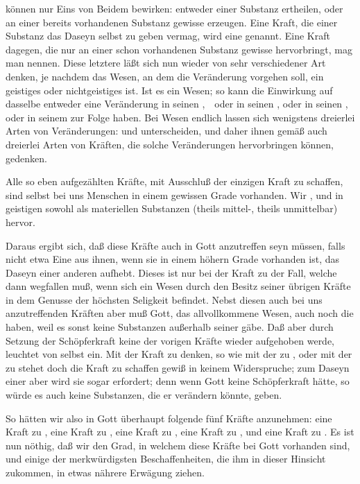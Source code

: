 \begin{aufza}
\item {} können nur Eins von Beidem bewirken: entweder einer Substanz  ertheilen, oder an einer bereits vorhandenen Substanz gewisse  erzeugen. Eine Kraft, die einer Substanz das Daseyn selbst zu geben vermag, wird eine  genannt. Eine Kraft dagegen, die nur an einer schon vorhandenen Substanz gewisse  hervorbringt, mag man  nennen. Diese letztere läßt sich nun wieder von sehr verschiedener Art denken, je nachdem das Wesen, an dem die Veränderung vorgehen soll, ein geistiges oder nichtgeistiges ist. Ist es ein  Wesen; so kann die Einwirkung auf dasselbe entweder eine Veränderung in seinen ,~\ oder in seinen , oder in seinen , oder in seinem  zur Folge haben. Bei  Wesen endlich lassen sich wenigstens dreierlei Arten von Veränderungen:  und  unterscheiden, und daher ihnen gemäß auch dreierlei Arten von Kräften, die solche Veränderungen hervorbringen können, gedenken.
\item Alle so eben aufgezählten Kräfte, mit Ausschluß der einzigen Kraft zu schaffen, sind selbst bei uns Menschen in einem gewissen Grade vorhanden. Wir , und  in geistigen sowohl als materiellen Substanzen (theils mittel-, theils unmittelbar) hervor.
\item Daraus ergibt sich, daß diese Kräfte auch in Gott anzutreffen seyn müssen, falls nicht etwa Eine aus ihnen, wenn sie in einem höhern Grade vorhanden ist, das Daseyn einer anderen aufhebt. Dieses ist nur bei der Kraft zu  der Fall, welche dann wegfallen muß, wenn sich ein Wesen durch den Besitz seiner übrigen Kräfte in dem Genusse der höchsten Seligkeit befindet. Nebst diesen auch bei uns anzutreffenden Kräften aber muß Gott, das allvollkommene Wesen, auch noch die  haben, weil es sonst keine Substanzen außerhalb seiner gäbe. Daß aber durch Setzung der Schöpferkraft keine der vorigen Kräfte wieder aufgehoben werde, leuchtet von selbst ein. Mit der Kraft zu denken, so wie mit der zu , oder mit der zu  stehet doch die Kraft zu schaffen gewiß in keinem Widerspruche; zum Daseyn einer  aber wird sie sogar erfordert; denn wenn Gott keine Schöpferkraft hätte, so würde es auch keine Substanzen, die er verändern könnte, geben.
\item So hätten wir also in Gott überhaupt folgende fünf Kräfte anzunehmen: eine Kraft zu , eine Kraft zu , eine Kraft zu , eine Kraft zu , und eine Kraft zu . Es ist nun nöthig, daß wir den Grad, in welchem diese Kräfte bei Gott vorhanden sind, und einige
der merkwürdigsten Beschaffenheiten, die ihm in dieser Hinsicht zukommen, in etwas nährere Erwägung ziehen.
\end{aufza}

